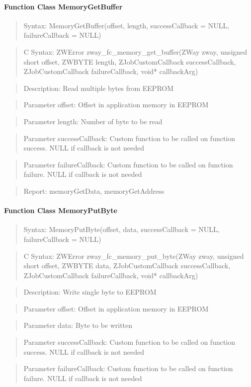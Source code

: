 \paragraph{Function Class MemoryGetBuffer}
\begin{quote}Syntax: MemoryGetBuffer(offset, length, successCallback = NULL, failureCallback = NULL)\end{quote}
\begin{quote}C Syntax: ZWError zway\_fc\_memory\_get\_buffer(ZWay zway, unsigned short offset, ZWBYTE length, ZJobCustomCallback successCallback, ZJobCustomCallback failureCallback, void* callbackArg)\end{quote}
\begin{quote}Description: Read multiple bytes from EEPROM\end{quote}
\begin{quote}Parameter offset: Offset in application memory in EEPROM\end{quote}
\begin{quote}Parameter length: Number of byte to be read\end{quote}
\begin{quote}Parameter successCallback: Custom function to be called on function success. NULL if callback is not needed\end{quote}
\begin{quote}Parameter failureCallback: Custom function to be called on function failure. NULL if callback is not needed\end{quote}
\begin{quote}Report: memoryGetData, memoryGetAddress\end{quote}

\paragraph{Function Class MemoryPutByte}
\begin{quote}Syntax: MemoryPutByte(offset, data, successCallback = NULL, failureCallback = NULL)\end{quote}
\begin{quote}C Syntax: ZWError zway\_fc\_memory\_put\_byte(ZWay zway, unsigned short offset, ZWBYTE data, ZJobCustomCallback successCallback, ZJobCustomCallback failureCallback, void* callbackArg)\end{quote}
\begin{quote}Description: Write single byte to EEPROM\end{quote}
\begin{quote}Parameter offset: Offset in application memory in EEPROM\end{quote}
\begin{quote}Parameter data: Byte to be written\end{quote}
\begin{quote}Parameter successCallback: Custom function to be called on function success. NULL if callback is not needed\end{quote}
\begin{quote}Parameter failureCallback: Custom function to be called on function failure. NULL if callback is not needed\end{quote}


